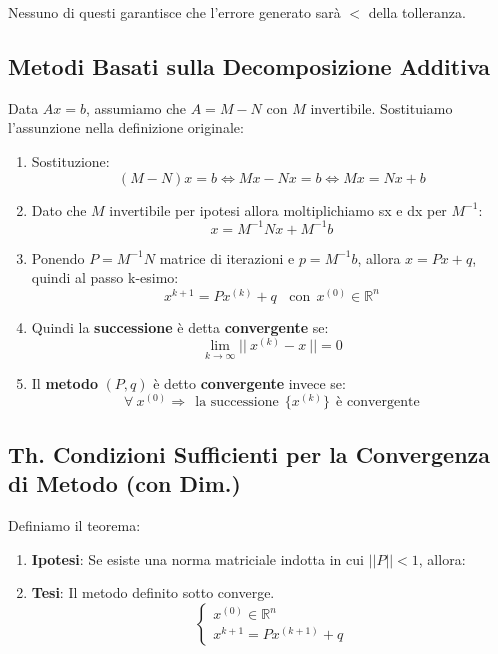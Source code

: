 \documentclass{article}
\begin{document}
Nessuno di questi garantisce che l'errore generato sarà $<$ della tolleranza.

\subsection{Metodi Basati sulla Decomposizione Additiva}

Data $Ax = b$, assumiamo che $A = M - N$ con $M$ invertibile. Sostituiamo l'assunzione nella definizione originale:

\vspace*{8px}

\begin{enumerate}
    \item Sostituzione:
    \[ (M - N)x = b \Leftrightarrow Mx - Nx = b \Leftrightarrow Mx = Nx + b  \]
    \vspace*{15px}
    \item Dato che $M$ invertibile per ipotesi allora moltiplichiamo sx e dx per $M^{-1}$:
    \[ x = M^{-1}Nx + M^{-1}b \]
    \item Ponendo $P=M^{-1}N$ matrice di iterazioni e $p = M^{-1}b$, allora $x = Px + q$, quindi al passo k-esimo:
    \vspace*{8px}
    \[ x^{k+1} = Px^{(k)} + q \:\:\:\: \text{con} \:\: x^{(0)} \in \mathbb{R}^{n} \]
    \item Quindi la \textbf{successione} è detta \textbf{convergente} se:
    \[ \lim_{k \rightarrow \infty} ||\: x^{(k)} - x \:|| = 0 \]
    \item Il \textbf{metodo} $(P,q)$ è detto \textbf{convergente} invece se: 
    \[ \forall \: x^{(0)} \Rightarrow \:\: \text{la successione} \:\: \{ x^{(k)} \} \:\: \text{è convergente}\]
\end{enumerate}

\subsection{Th. Condizioni Sufficienti per la Convergenza di Metodo (con Dim.)}

Definiamo il teorema:

\begin{enumerate}
    \item \textbf{Ipotesi}: Se esiste una norma matriciale indotta in cui $||P|| < 1$, allora:
    \item \textbf{Tesi}: Il metodo definito sotto converge.
    \vspace*{10px}
    \[ \left\{ \begin{array}{rcl}
        x^{(0)} \in \mathbb{R}^{n} \\ 
        x^{k+1} = Px^{(k+1)} + q 
        \end{array}\right.
         \]
\end{enumerate}
\end{document}
